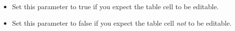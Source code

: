 
\begin{itemize}
\item Set this parameter to true if you expect the table cell to be editable. 
\item  Set this parameter to false if you expect the table cell \emph{not} to be editable.
\end{itemize}
